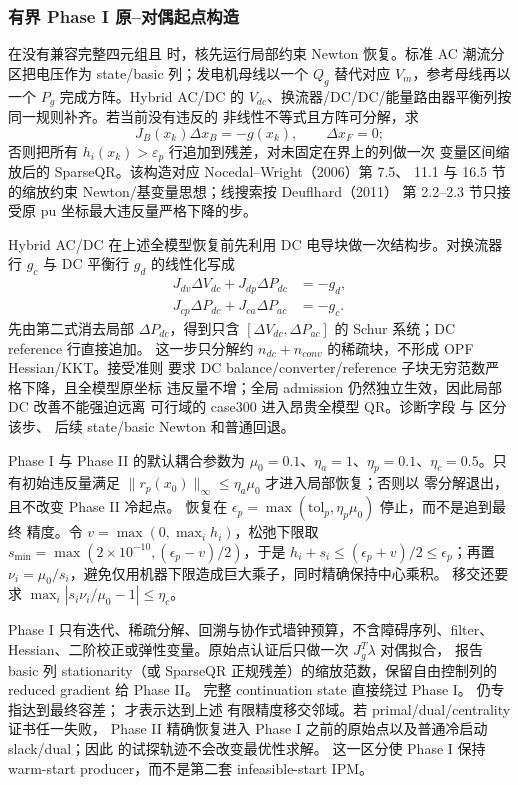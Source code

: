 \subsubsection*{有界 Phase I 原--对偶起点构造}
在没有兼容完整四元组且  时，核先运行局部约束
Newton 恢复。标准 AC 潮流分区把电压作为 state/basic 列；发电机母线以一个
$Q_g$ 替代对应 $V_m$，参考母线再以一个 $P_g$ 完成方阵。Hybrid AC/DC 的
$V_{dc}$、换流器/DC/DC/能量路由器平衡列按同一规则补齐。若当前没有违反的
非线性不等式且方阵可分解，求
\begin{equation}
 J_B(x_k)\Delta x_B=-g(x_k),\qquad \Delta x_F=0;
\end{equation}
否则把所有 $h_i(x_k)>\varepsilon_p$ 行追加到残差，对未固定在界上的列做一次
变量区间缩放后的 SparseQR。该构造对应 Nocedal--Wright（2006）第 7.5、
11.1 与 16.5 节的缩放约束 Newton/基变量思想；线搜索按 Deuflhard（2011）
第 2.2--2.3 节只接受原 pu 坐标最大违反量严格下降的步。

Hybrid AC/DC 在上述全模型恢复前先利用 DC 电导块做一次结构步。对换流器行
$g_c$ 与 DC 平衡行 $g_d$ 的线性化写成
\begin{align}
J_{dv}\Delta V_{dc}+J_{dp}\Delta P_{dc}&=-g_d,\\
J_{cp}\Delta P_{dc}+J_{ca}\Delta P_{ac}&=-g_c.
\end{align}
先由第二式消去局部 $\Delta P_{dc}$，得到只含
$[\Delta V_{dc},\Delta P_{ac}]$ 的 Schur 系统；DC reference 行直接追加。
这一步只分解约 $n_{dc}+n_{conv}$ 的稀疏块，不形成 OPF Hessian/KKT。接受准则
要求 DC balance/converter/reference 子块无穷范数严格下降，且全模型原坐标
违反量不增；全局 admission 仍然独立生效，因此局部 DC 改善不能强迫远离
可行域的 case300 进入昂贵全模型 QR。诊断字段
 与  区分该步、
后续 state/basic Newton 和普通回退。

Phase I 与 Phase II 的默认耦合参数为
$\mu_0=0.1$、$\eta_a=1$、$\eta_p=0.1$、$\eta_c=0.5$。只有初始违反量满足
$\|r_p(x_0)\|_\infty\le\eta_a\mu_0$ 才进入局部恢复；否则以
 零分解退出，且不改变 Phase II 冷起点。
恢复在 $\epsilon_p=\max(\mathrm{tol}_p,\eta_p\mu_0)$ 停止，而不是追到最终
精度。令 $v=\max(0,\max_i h_i)$，松弛下限取
$s_{\min}=\max(2\times10^{-10},(\epsilon_p-v)/2)$，于是
$h_i+s_i\le(\epsilon_p+v)/2\le\epsilon_p$；再置
$\nu_i=\mu_0/s_i$，避免仅用机器下限造成巨大乘子，同时精确保持中心乘积。
移交还要求 $\max_i|s_i\nu_i/\mu_0-1|\le\eta_c$。

Phase I 只有迭代、稀疏分解、回溯与协作式墙钟预算，不含障碍序列、filter、
Hessian、二阶校正或弹性变量。原始点认证后只做一次 $J_g^T\lambda$ 对偶拟合，
 报告 basic 列 stationarity（或 SparseQR
正规残差）的缩放范数，保留自由控制列的 reduced gradient 给 Phase II。
完整 continuation state 直接绕过 Phase I。
仍专指达到最终容差； 才表示达到上述
有限精度移交邻域。若 primal/dual/centrality 证书任一失败，
Phase II 精确恢复进入 Phase I 之前的原始点以及普通冷启动 slack/dual；因此
 的试探轨迹不会改变最优性求解。
这一区分使 Phase I 保持 warm-start producer，而不是第二套 infeasible-start IPM。

